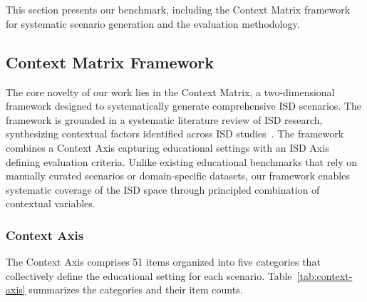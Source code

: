 \section{\benchmark{}}
\label{sec:benchmark}

This section presents our benchmark, including the Context Matrix framework for systematic scenario generation and the evaluation methodology.

\subsection{Context Matrix Framework}
\label{subsec:context-matrix}

The core novelty of our work lies in the Context Matrix, a two-dimensional framework designed to systematically generate comprehensive ISD scenarios. The framework is grounded in a systematic literature review of ISD research, synthesizing contextual factors identified across ISD studies~\cite{branch2009addie,dick1978systematic,morrison2019designing}. The framework combines a Context Axis capturing educational settings with an ISD Axis defining evaluation criteria. Unlike existing educational benchmarks that rely on manually curated scenarios or domain-specific datasets, our framework enables systematic coverage of the ISD space through principled combination of contextual variables.


\subsubsection{Context Axis}
The Context Axis comprises 51 items organized into five categories that collectively define the educational setting for each scenario. Table~\ref{tab:context-axis} summarizes the categories and their item counts.

